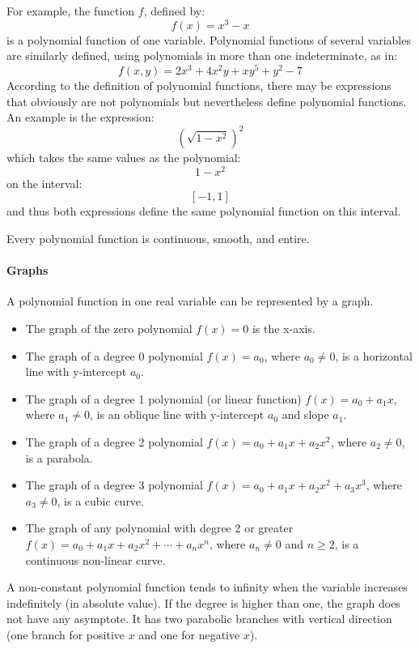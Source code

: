 For example, the function $f$, defined by:
$$
f(x) = x^3 - x
$$
is a polynomial function of one variable. Polynomial functions of several variables are similarly defined, using polynomials in more than one indeterminate, as in:
$$
f(x, y) = 2x^3 + 4x^2 y + xy^5 + y^2 - 7
$$
According to the definition of polynomial functions, there may be expressions that obviously are not polynomials but nevertheless define polynomial functions. An example is the expression:
$$
\left(\sqrt{1 - x^2}\right)^2
$$
which takes the same values as the polynomial:
$$
1 - x^2
$$
on the interval:
$$
[-1, 1]
$$
and thus both expressions define the same polynomial function on this interval.

Every polynomial function is continuous, smooth, and entire.

\paragraph{Graphs}

A polynomial function in one real variable can be represented by a graph.

\begin{itemize}
    \item The graph of the zero polynomial $f(x) = 0$ is the x-axis.
    \item The graph of a degree 0 polynomial $f(x) = a_0$, where $a_0 \neq 0$, is a horizontal line with y-intercept $a_0$.
    \item The graph of a degree 1 polynomial (or linear function) $f(x) = a_0 + a_1 x$, where $a_1 \neq 0$, is an oblique line with y-intercept $a_0$ and slope $a_1$.
    \item The graph of a degree 2 polynomial $f(x) = a_0 + a_1 x + a_2 x^2$, where $a_2 \neq 0$, is a parabola.
    \item The graph of a degree 3 polynomial $f(x) = a_0 + a_1 x + a_2 x^2 + a_3 x^3$, where $a_3 \neq 0$, is a cubic curve.
    \item The graph of any polynomial with degree 2 or greater $f(x) = a_0 + a_1 x + a_2 x^2 + \cdots + a_n x^n$, where $a_n \neq 0$ and $n \geq 2$, is a continuous non-linear curve.
\end{itemize}

A non-constant polynomial function tends to infinity when the variable increases indefinitely (in absolute value). If the degree is higher than one, the graph does not have any asymptote. It has two parabolic branches with vertical direction (one branch for positive $x$ and one for negative $x$).

